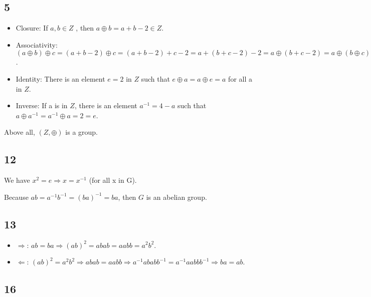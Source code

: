 \documentclass{article}
\begin{document}
		\subsection*{5}

		\begin{itemize}

				\item Closure: If $a,b \in Z$ , then $a \oplus b = a + b - 2 \in Z$.

				\item Associativity: $(a\oplus b)\oplus c = (a + b - 2)\oplus c = (a + b - 2) + c - 2 = a + (b + c - 2) - 2 = a\oplus(b + c - 2) = a \oplus(b\oplus c)$.

				\item Identity: There is an element $e = 2$ in $Z$ such that $e \oplus a = a \oplus e = a $ for all a in $Z$.

				\item Inverse: If a is in $Z$, there is an element $a^{-1} = 4 - a$ such that $a\oplus a^{-1} = a^{-1}\oplus a = 2 = e$.

		\end{itemize}

		Above all, $(Z,\oplus)$ is a group.

		\subsection*{12}

		We have $x^2 = e \Rightarrow x = x^{-1}$ (for all x in G).

		Because $ab = a^{-1}b^{-1} = (ba)^{-1} = ba$, then $G$ is an abelian group.

		\subsection*{13}

		\begin{itemize}

				\item $\Rightarrow$: $ab = ba \Rightarrow (ab)^2 = abab = aabb = a^2b^2$.

				\item $\Leftarrow $: $(ab)^2 = a^2b^2 \Rightarrow abab = aabb \Rightarrow a^{-1}ababb^{-1} = a^{-1}aabbb^{-1} \Rightarrow ba = ab$.

		\end{itemize}
		\subsection*{16}
\end{document}
